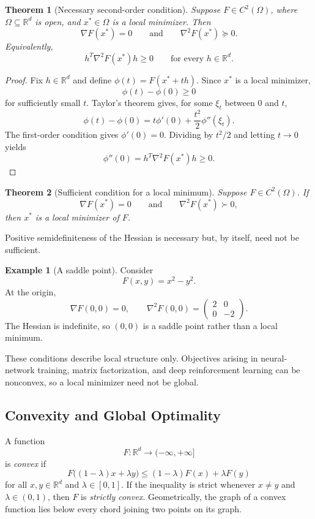 \documentclass[12pt,oneside]{book}
\numberwithin{equation}{section}
\theoremstyle{definition}
\newtheorem{example}{Example}[section]
\theoremstyle{plain}
\newtheorem{theorem}{Theorem}[section]
\theoremstyle{remark}
\newcommand{\R}{\mathbb{R}}
\begin{document}
\begin{theorem}[Necessary second-order condition]
Suppose $F\in C^2(\Omega)$, where $\Omega\subseteq\R^d$ is open, and $x^*\in\Omega$ is a local minimizer. Then
\[
\nabla F(x^*)=0
\qquad\text{and}\qquad
\nabla^2F(x^*)\succeq0.
\]
Equivalently,
\[
h^T\nabla^2F(x^*)h\geq0
\qquad\text{for every }h\in\R^d.
\]
\end{theorem}

\begin{proof}
Fix $h\in\R^d$ and define $\phi(t)=F(x^*+th)$. Since $x^*$ is a local minimizer,
\[
\phi(t)-\phi(0)\geq0
\]
for sufficiently small $t$. Taylor's theorem gives, for some $\xi_t$ between $0$ and $t$,
\[
\phi(t)-\phi(0)
=t\phi'(0)+\frac{t^2}{2}\phi''(\xi_t).
\]
The first-order condition gives $\phi'(0)=0$. Dividing by $t^2/2$ and letting $t\to0$ yields
\[
\phi''(0)=h^T\nabla^2F(x^*)h\geq0.
\]
\end{proof}

\begin{theorem}[Sufficient condition for a local minimum]
Suppose $F\in C^2(\Omega)$. If
\[
\nabla F(x^*)=0
\qquad\text{and}\qquad
\nabla^2F(x^*)\succ0,
\]
then $x^*$ is a local minimizer of $F$.
\end{theorem}
Positive semidefiniteness of the Hessian is necessary but, by itself, need not be sufficient.

\begin{example}[A saddle point]
Consider
\[
F(x,y)=x^2-y^2.
\]
At the origin,
\[
\nabla F(0,0)=0,
\qquad
\nabla^2F(0,0)=
\begin{pmatrix}
2&0\\
0&-2
\end{pmatrix}.
\]
The Hessian is indefinite, so $(0,0)$ is a saddle point rather than a local minimum.
\end{example}

These conditions describe local structure only. Objectives arising in neural-network training, matrix factorization, and deep reinforcement learning can be nonconvex, so a local minimizer need not be global.

\subsection{Convexity and Global Optimality}
A function
\[
F\colon\R^d\to(-\infty,+\infty]
\]
is \emph{convex} if
\[
F\bigl((1-\lambda)x+\lambda y\bigr)
\leq(1-\lambda)F(x)+\lambda F(y)
\]
for all $x,y\in\R^d$ and $\lambda\in[0,1]$. If the inequality is strict whenever $x\neq y$ and $\lambda\in(0,1)$, then $F$ is \emph{strictly convex}. Geometrically, the graph of a convex function lies below every chord joining two points on its graph.
\end{document}
